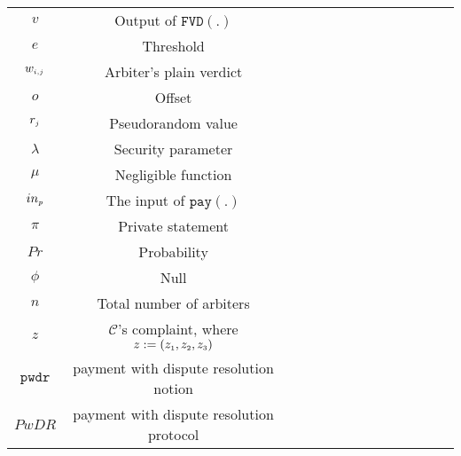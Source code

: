 \begin{table*}[!htbp]
\begin{scriptsize}
\begin{center}
{{\begin{tabular}{|c|c|c|c|c|c|c|c|c|c|c|c|c|c|}
%
\cellcolor{gray!20}\scriptsize$v$ &\cellcolor{gray!20}\scriptsize  Output of $\mathtt{FVD}(.)$\\ 
%
\cellcolor{white!20}\scriptsize$e$ &\cellcolor{white!20}\scriptsize  Threshold\\ 
%            
 \cellcolor{gray!20}\scriptsize$w_{\scriptscriptstyle i,j}$ &\cellcolor{gray!20}\scriptsize  Arbiter's plain verdict\\ 
%     
\cellcolor{white!20}\scriptsize$o$ &\cellcolor{white!20}\scriptsize  Offset\\  
  \cellcolor{gray!20}\scriptsize$r_{\scriptscriptstyle j}$ &\cellcolor{gray!20}\scriptsize  Pseudorandom value\\   
\cellcolor{white!20}\scriptsize$\lambda$ &\cellcolor{white!20}\scriptsize Security parameter\\  
%
\cellcolor{gray!20}\scriptsize$\mu$ &\cellcolor{gray!20}\scriptsize Negligible function\\  


\cellcolor{white!20}\scriptsize$in_{\scriptscriptstyle p}$ &\cellcolor{white!20}\scriptsize The input of $\mathtt{pay}(.)$\\                    
%
\cellcolor{gray!20}\scriptsize$\pi$ &\cellcolor{gray!20}\scriptsize Private statement\\        
  \cellcolor{white!20}\scriptsize$Pr$ &\cellcolor{white!20}\scriptsize Probability\\   

%
\cellcolor{gray!20}\scriptsize$\phi$ &\cellcolor{gray!20}\scriptsize  Null\\ 
%
\cellcolor{white!20}\scriptsize$n$ &\cellcolor{white!20}\scriptsize  Total number of arbiters\\  
%           
\cellcolor{gray!20}\scriptsize$z$ &\cellcolor{gray!20}\scriptsize  $\mathcal{C}$'s complaint, where $z:=(z_{\scriptscriptstyle 1}, z_{\scriptscriptstyle 2}, z_{\scriptscriptstyle 3})$\\ 
%
\cellcolor{white!20}\scriptsize$\mathtt{pwdr}$ &\cellcolor{white!20}\scriptsize  payment with dispute resolution notion\\ 
%
\cellcolor{gray!20}\scriptsize$PwDR$ &\cellcolor{gray!20}\scriptsize  payment with dispute resolution protocol\\ 
\hline 

\hline 
      

           
              
\end{tabular}\label{table:notation-table}
%
}}
\end{center}
\end{scriptsize}
\end{table*}





























